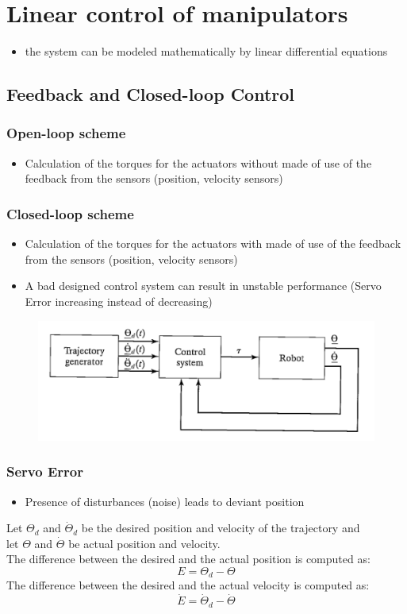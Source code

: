 \documentclass[10pt,a4paper]{article}
\begin{document}
\section{Linear control of manipulators}
\begin{itemize}
	\item the system can be modeled mathematically by linear differential equations
\end{itemize}

\subsection{Feedback and Closed-loop Control}
\subsubsection{Open-loop scheme}
\begin{itemize}
	\item Calculation of the torques for the actuators without made of use of the feedback from the sensors (position, velocity sensors)
\end{itemize}

\subsubsection{Closed-loop scheme}
\begin{itemize}
	\item Calculation of the torques for the actuators with made of use of the feedback from the sensors (position, velocity sensors)
	\item A bad designed control system can result in unstable performance (Servo Error increasing instead of decreasing)
\end{itemize}

\begin{figure}[H]
	\includegraphics[width=0.5\columnwidth]{imgs/closed_loop_scheme.png}
\end{figure}

\subsubsection{Servo Error}
\begin{itemize}
	\item Presence of disturbances (noise) leads to deviant position
\end{itemize}
Let $\Theta_d$ and $\dot \Theta_d$ be the desired position and velocity of the trajectory and \\
let $\Theta$ and $\dot \Theta$ be actual position and velocity. \\
The difference between the desired and the actual position is computed as: 
$$
	E = \Theta_d - \Theta
$$
The difference between the desired and the actual velocity is computed as: 
$$
	\dot E = \dot \Theta_d - \dot \Theta
$$
\end{document}
